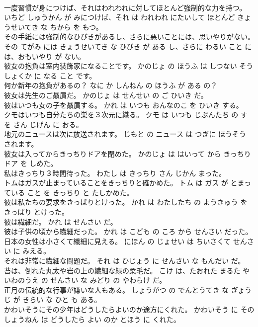 \documentclass[8pt]{extreport}
\begin{document}
\begin{CJK}{UTF8}{min}
\\	一度習慣が身につけば、それはわれわれに対してほとんど強制的な力を持つ。	いちど しゅうかん が みにつけば、それ は われわれ にたいして ほとんど きょうせいてき な ちから を もつ。	
\\	その手紙には強制的なひびきがあるし、さらに悪いことには、思いやりがない。	その てがみ には きょうせいてき な ひびき が ある し、さらに わるい こと には、おもいやり が ない。	
\\	彼女の抱負は室内装飾家になることです。	かのじょ の ほうふ は しつない そうしょくか に なる こと です。	
\\	何か新年の抱負があるの？	なに か しんねん の ほうふ が ある の？	
\\	彼女は先生のご贔屓だ。	かのじょ は せんせい の ご ひいき だ。	
\\	彼はいつも女の子を贔屓する。	かれ は いつも おんなのこ を ひいき する。	
\\	クモはいつも自分たちの巣を３次元に織る。	クモ は いつも じぶんたち の す を さん じげん に おる。	
\\	地元のニュースは次に放送されます。	じもと の ニュース は つぎに ほうそう されます。	
\\	彼女は入ってからきっちりドアを閉めた。	かのじょ は はいって から きっちり ドア を しめた。	
\\	私はきっちり３時間待った。	わたし は きっちり さん じかん まった。	
\\	トムはガスが止まっていることをきっちりと確かめた。	トム は ガス が とまっている こと を きっちり と たしかめた。	
\\	彼は私たちの要求をきっぱりとけった。	かれ は わたしたち の ようきゅう を きっぱり とけった。	
\\	彼は繊細だ。	かれ は せんさい だ。	
\\	彼は子供の頃から繊細だった。	かれ は こども の ころ から せんさい だった。	
\\	日本の女性は小さくて繊細に見える。	にほん の じょせい は ちいさくて せんさい に みえる。	
\\	それは非常に繊細な問題だ。	それ は ひじょう に せんさい な もんだい だ。	
\\	苔は、倒れた丸太や岩の上の繊細な緑の柔毛だ。	こけ は、たおれた まるた や いわのうえ の せんさい な みどり の やわらけ だ。	
\\	正月の伝統的な行事が嫌いな人もある。	しょうがつ の でんとうてき な ぎょうじ が きらい な ひと も ある。	
\\	かわいそうにその少年はどうしたらよいのか途方にくれた。	かわいそう に その しょうねん は どうしたら よい のか とほう に くれた。	

\end{CJK}
\end{document}
